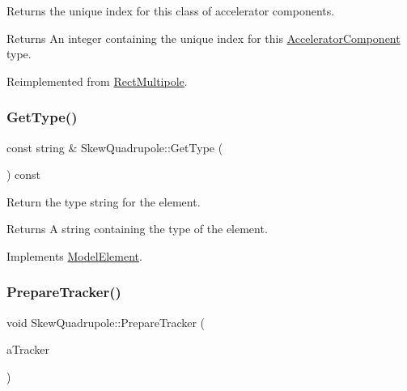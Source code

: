 Returns the unique index for this class of accelerator components. \begin{DoxyReturn}{Returns}
An integer containing the unique index for this \hyperlink{classAcceleratorComponent}{Accelerator\+Component} type. 
\end{DoxyReturn}


Reimplemented from \hyperlink{classRectMultipole_a9bc789b2a193e341aab8bbd47a0e3ad4}{Rect\+Multipole}.

\mbox{\label{classSkewQuadrupole_a12f3bb5618dfc4516cf975c01f634a22}} 
\subsubsection{\texorpdfstring{Get\+Type()}{GetType()}}
{\footnotesize\ttfamily const string \& Skew\+Quadrupole\+::\+Get\+Type (\begin{DoxyParamCaption}{ }\end{DoxyParamCaption}) const\hspace{0.3cm}{\ttfamily [virtual]}}

Return the type string for the element. \begin{DoxyReturn}{Returns}
A string containing the type of the element. 
\end{DoxyReturn}


Implements \hyperlink{classModelElement_a04dc2e51e1999fca612eb1838ec6b271}{Model\+Element}.

\mbox{\label{classSkewQuadrupole_ac277fd65922256a16c1d2774254c09d2}} 
\subsubsection{\texorpdfstring{Prepare\+Tracker()}{PrepareTracker()}}
{\footnotesize\ttfamily void Skew\+Quadrupole\+::\+Prepare\+Tracker (\begin{DoxyParamCaption}\item[{\hyperlink{classComponentTracker}{Component\+Tracker} \&}]{a\+Tracker }\end{DoxyParamCaption})\hspace{0.3cm}{\ttfamily [virtual]}}

